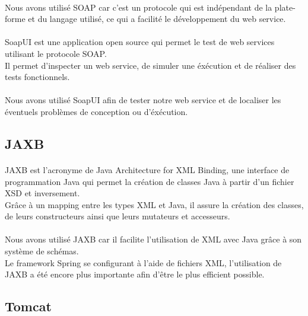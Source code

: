 \paragraph{}
Nous avons utilisé SOAP car c'est un protocole qui est indépendant de la plate-forme et du langage utilisé, ce qui a facilité le développement du web service.\\
\paragraph{}
SoapUI est une application open source qui permet le test de web services utilisant le protocole SOAP.\\
Il permet d'inspecter un web service, de simuler une éxécution et de réaliser des tests fonctionnels.\\
\paragraph{}
Nous avons utilisé SoapUI afin de tester notre web service et de localiser les éventuels problèmes de conception ou d'éxécution.\\

\subsection{JAXB}
\paragraph{} JAXB est l'acronyme de Java Architecture for XML Binding, une interface de programmation Java qui permet la création de classes Java à partir d'un fichier XSD et inversement.\\
Grâce à un mapping entre les types XML et Java, il assure la création des classes, de leurs constructeurs ainsi que leurs mutateurs et accesseurs.\\
\paragraph{}
Nous avons utilisé JAXB car il facilite l'utilisation de XML avec Java grâce à son système de schémas.\\
Le framework Spring se configurant à l'aide de fichiers XML, l'utilisation de JAXB a été encore plus importante afin d'être le plus efficient possible.\\

\subsection{Tomcat}
